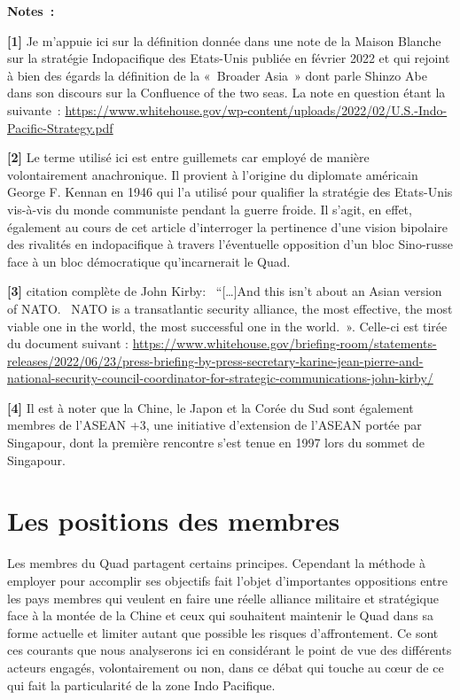 \documentclass[11pt,a4paper]{article}
\begin{document}
\textbf{Notes~:}

\textbf{{[}1{]}} Je m'appuie ici sur la définition donnée dans une note de la Maison Blanche sur la stratégie Indopacifique des Etats-Unis publiée en février 2022 et qui rejoint à bien des égards la définition de la «~Broader Asia~» dont parle Shinzo Abe dans son discours sur la Confluence of the two seas. La note en question étant la suivante~: \url{https://www.whitehouse.gov/wp-content/uploads/2022/02/U.S.-Indo-Pacific-Strategy.pdf}

\textbf{{[}2{]}} Le terme utilisé ici est entre guillemets car employé de manière volontairement anachronique. Il provient à l'origine du diplomate américain George F. Kennan en 1946 qui l'a utilisé pour qualifier la stratégie des Etats-Unis vis-à-vis du monde communiste pendant la guerre froide. Il s'agit, en effet, également au cours de cet article d'interroger la pertinence d'une vision bipolaire des rivalités en indopacifique à travers l'éventuelle opposition d'un bloc Sino-russe face à un bloc démocratique qu'incarnerait le Quad.

\textbf{{[}3{]}} citation complète de John Kirby: ~``{[}\ldots{]}And this isn't about an Asian version of NATO.~ NATO is a transatlantic security alliance, the most effective, the most viable one in the world, the most successful one in the world.~». Celle-ci est tirée du document suivant : \url{https://www.whitehouse.gov/briefing-room/statements-releases/2022/06/23/press-briefing-by-press-secretary-karine-jean-pierre-and-national-security-council-coordinator-for-strategic-communications-john-kirby/}

\textbf{{[}4{]}} Il est à noter que la Chine, le Japon et la Corée du Sud sont également membres de l'ASEAN +3, une initiative d'extension de l'ASEAN portée par Singapour, dont la première rencontre s'est tenue en 1997 lors du sommet de Singapour.

\section{Les positions des membres}

Les membres du Quad partagent certains principes. Cependant la méthode à employer pour accomplir ses objectifs fait l'objet d'importantes oppositions entre les pays membres qui veulent en faire une réelle alliance militaire et stratégique face à la montée de la Chine et ceux qui souhaitent maintenir le Quad dans sa forme actuelle et limiter autant que possible les risques d'affrontement. Ce sont ces courants que nous analyserons ici en considérant le point de vue des différents acteurs engagés, volontairement ou non, dans ce débat qui touche au cœur de ce qui fait la particularité de la zone Indo Pacifique.
\end{document}
